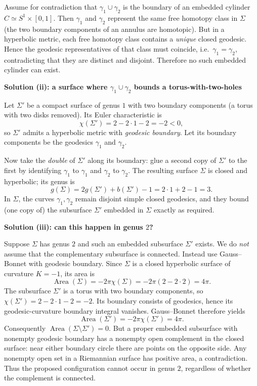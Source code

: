 \begin{solution}
Assume for contradiction that $\gamma_1\cup\gamma_2$ is the boundary of an embedded cylinder $C\simeq S^1\times[0,1]$.
Then $\gamma_1$ and $\gamma_2$ represent the same free homotopy class in $\Sigma$ (the two boundary components of an annulus are homotopic).
But in a hyperbolic metric, each free homotopy class contains a \emph{unique} closed geodesic.
Hence the geodesic representatives of that class must coincide, i.e.\ $\gamma_1=\gamma_2$, contradicting that they are distinct and disjoint.
Therefore no such embedded cylinder can exist.

\par\medskip\noindent\textbf{Solution (ii): a surface where $\gamma_1\cup\gamma_2$ bounds a torus-with-two-holes}\par\smallskip

Let $\Sigma'$ be a compact surface of genus $1$ with two boundary components (a torus with two disks removed).
Its Euler characteristic is
\[
\chi(\Sigma')=2-2\cdot 1-2=-2<0,
\]
so $\Sigma'$ admits a hyperbolic metric with \emph{geodesic boundary}.
Let its boundary components be the geodesics $\gamma_1$ and $\gamma_2$.

Now take the \emph{double} of $\Sigma'$ along its boundary:
glue a second copy of $\Sigma'$ to the first by identifying $\gamma_1$ to $\gamma_1$ and $\gamma_2$ to $\gamma_2$.
The resulting surface $\Sigma$ is closed and hyperbolic; its genus is
\[
g(\Sigma)=2g(\Sigma')+b(\Sigma')-1=2\cdot 1+2-1=3.
\]
In $\Sigma$, the curves $\gamma_1,\gamma_2$ remain disjoint simple closed geodesics, and they bound (one copy of) the subsurface $\Sigma'$
embedded in $\Sigma$ exactly as required.

\par\medskip\noindent\textbf{Solution (iii): can this happen in genus $2$?}\par\smallskip

Suppose $\Sigma$ has genus $2$ and such an embedded subsurface
$\Sigma'$ exists.  We do \emph{not} assume that the complementary
subsurface is connected.  Instead use Gauss--Bonnet with geodesic
boundary.  Since $\Sigma$ is a closed hyperbolic surface of curvature
$K=-1$, its area is
\[
\operatorname{Area}(\Sigma)=-2\pi\chi(\Sigma)
=-2\pi(2-2\cdot 2)=4\pi.
\]
The subsurface $\Sigma'$ is a torus with two boundary components,
so $\chi(\Sigma')=2-2\cdot1-2=-2$.
Its boundary consists of geodesics, hence its geodesic-curvature
boundary integral vanishes.  Gauss--Bonnet therefore yields
\[
\operatorname{Area}(\Sigma')=-2\pi\chi(\Sigma')=4\pi.
\]
Consequently $\operatorname{Area}(\Sigma\setminus\Sigma')=0$.
But a proper embedded subsurface with nonempty geodesic boundary
has a nonempty open complement in the closed surface: near either
boundary circle there are points on the opposite side.
Any nonempty open set in a Riemannian surface has positive area,
a contradiction.  Thus the proposed configuration cannot occur
in genus $2$, regardless of whether the complement is connected.


\end{solution}
